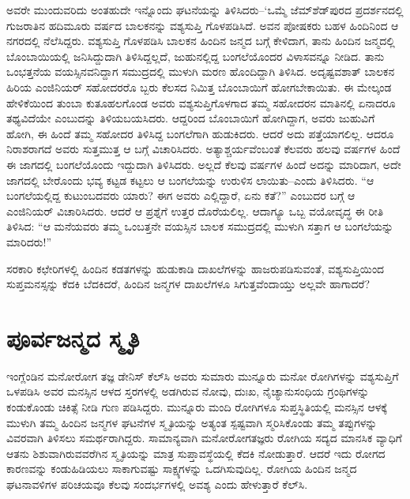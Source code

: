 ಅವರೇ ಮುಂದುವರಿದು ಅಂತಹುದೇ ಇನ್ನೊಂದು ಘಟನೆಯನ್ನು ತಿಳಿಸಿದರು–‘ಒಮ್ಮೆ ಜೆಮ್​ಶೆಡ್​ಪುರದ ಪ್ರದರ್ಶನದಲ್ಲಿ ಗುಜರಾತಿನ ಹದಿಮೂರು ವರ್ಷದ ಬಾಲಕನನ್ನು ವಶ್ಯಸುಪ್ತಿ ಗೊಳಪಡಿಸಿದೆ. ಅವನ ಪೋಷಕರು ಬಹಳ ಹಿಂದಿನಿಂದ ಆ ನಗರದಲ್ಲಿ ನೆಲೆಸಿದ್ದರು. ವಶ್ಯಸುಪ್ತಿ ಗೊಳಪಡಿಸಿ ಬಾಲಕನ ಹಿಂದಿನ ಜನ್ಮದ ಬಗ್ಗೆ ಕೇಳಿದಾಗ, ತಾನು ಹಿಂದಿನ ಜನ್ಮದಲ್ಲಿ ಬೊಂಬಾಯಿಯಲ್ಲಿ ಜನಿಸಿದ್ದುದಾಗಿ ತಿಳಿಸಿದ್ದಲ್ಲದೆ, ಜುಹುನಲ್ಲಿದ್ದ ಬಂಗಲೆಯೊಂದರ ವಿಳಾಸವನ್ನೂ ನೀಡಿದ. ತಾನು ಒಂಭತ್ತನೆಯ ವಯಸ್ಸಿನವನಿದ್ದಾಗ ಸಮುದ್ರದಲ್ಲಿ ಮುಳುಗಿ ಮರಣ ಹೊಂದಿದ್ದಾಗಿ ತಿಳಿಸಿದ. ಅದೃಷ್ಟವಶಾತ್ ಬಾಲಕನ ಹಿರಿಯ ಎಂಜಿನಿಯರ್ ಸಹೋದರರೊ ಬ್ಬರು ಕೆಲಸದ ನಿಮಿತ್ತ ಬೊಂಬಾಯಿಗೆ ಹೋಗಬೇಕಾಯಿತು. ಈ ಮೇಲ್ಕಂಡ ಹೇಳಿಕೆಯಿಂದ ತುಂಬಾ ಕುತೂಹಲಗೊಂಡ ಅವರು ವಶ್ಯಸುಪ್ತಿಗೊಳಗಾದ ತಮ್ಮ ಸಹೋದರನ ಮಾತಿನಲ್ಲಿ ಏನಾದರೂ ತಥ್ಯವಿದೆಯೇ ಎಂಬುದನ್ನು ತಿಳಿಯಬಯಸಿದರು. ಆದ್ದರಿಂದ ಬೊಂಬಾಯಿಗೆ ಹೋಗಿದ್ದಾಗ, ಅವರು ಜುಹುವಿಗೆ ಹೋಗಿ, ಈ ಹಿಂದೆ ತಮ್ಮ ಸಹೋದರ ತಿಳಿಸಿದ್ದ ಬಂಗಲೆಗಾಗಿ ಹುಡುಕಿದರು. ಆದರೆ ಅದು ಪತ್ತೆಯಾಗಲಿಲ್ಲ. ಆದರೂ ನಿರಾಶರಾಗದೆ ಅವರು ಸುತ್ತಮುತ್ತ ಆ ಬಗ್ಗೆ ವಿಚಾರಿಸಿದರು. ಅತ್ಯಾಶ್ಚರ್ಯವೆಂಬಂತೆ ಕೆಲವರು ಹಲವು ವರ್ಷಗಳ ಹಿಂದೆ ಈ ಜಾಗದಲ್ಲಿ ಬಂಗಲೆಯೊಂದು ಇದ್ದುದಾಗಿ ತಿಳಿಸಿದರು. ಅಲ್ಲದೆ ಕೆಲವು ವರ್ಷಗಳ ಹಿಂದೆ ಅದನ್ನು ಮಾರಿದಾಗ, ಅದೇ ಜಾಗದಲ್ಲಿ ಬೇರೊಂದು ಭವ್ಯ ಕಟ್ಟಡ ಕಟ್ಟಲು ಆ ಬಂಗಲೆಯನ್ನು ಉರುಳಿಸ ಲಾಯಿತು–ಎಂದು ತಿಳಿಸಿದರು. “ಆ ಬಂಗಲೆಯಲ್ಲಿದ್ದ ಕುಟುಂಬದವರು ಯಾರು? ಈಗ ಅವರು ಎಲ್ಲಿದ್ದಾರೆ, ಏನು ಕತೆ?” ಎಂಬುದರ ಬಗ್ಗೆ ಆ ಎಂಜಿನಿಯರ್ ವಿಚಾರಿಸಿದರು. ಆದರೆ ಆ ಪ್ರಶ್ನೆಗೆ ಉತ್ತರ ದೊರೆಯಲಿಲ್ಲ. ಆದಾಗ್ಯೂ ಒಬ್ಬ ವಯೋವೃದ್ಧ ಈ ರೀತಿ ತಿಳಿಸಿದ: “ಆ ಮನೆಯವರು ತಮ್ಮ ಒಂಬತ್ತನೇ ವಯಸ್ಸಿನ ಬಾಲಕ ಸಮುದ್ರದಲ್ಲಿ ಮುಳುಗಿ ಸತ್ತಾಗ ಆ ಬಂಗಲೆಯನ್ನು ಮಾರಿದರು!”

ಸರಕಾರಿ ಕಛೇರಿಗಳಲ್ಲಿ ಹಿಂದಿನ ಕಡತಗಳನ್ನು ಹುಡುಕಾಡಿ ದಾಖಲೆಗಳನ್ನು ಹಾಜರುಪಡಿಸುವಂತೆ, ವಶ್ಯಸುಪ್ತಿಯಿಂದ ಸುಪ್ತಮನಸ್ಸನ್ನು ಕೆದಕಿ ಬೆದಕಿದರೆ, ಹಿಂದಿನ ಜನ್ಮಗಳ ದಾಖಲೆಗಳೂ ಸಿಗುತ್ತವೆಂದಾಯ್ತು ಅಲ್ಲವೇ ಹಾಗಾದರೆ?


\section{ಪೂರ್ವಜನ್ಮದ ಸ್ಮೃತಿ}

ಇಂಗ್ಲೆಂಡಿನ ಮನೋರೋಗ ತಜ್ಞ ಡೇನಿಸ್ ಕೆಲ್​ಸಿ ಅವರು ಸುಮಾರು ಮುನ್ನೂರು ಮನೋ ರೋಗಿಗಳನ್ನು ವಶ್ಯಸುಪ್ತಿಗೆ ಒಳಪಡಿಸಿ ಅವರ ಮನಸ್ಸಿನ ಆಳದ ಸ್ತರಗಳಲ್ಲಿ ಅಡಗಿರುವ ನೋವು, ದುಃಖ, ನೈಚ್ಯಾನುಸಂಧಿಯ ಗ್ರಂಥಿಗಳನ್ನು  ಕಂಡುಕೊಂಡು ಚಿಕಿತ್ಸೆ ನೀಡಿ ಗುಣ ಪಡಿಸಿದ್ದರು. ಮುನ್ನೂರು ಮಂದಿ ರೋಗಿಗಳೂ ಸುಪ್ತಸ್ಥಿತಿಯಲ್ಲಿ ಮನಸ್ಸಿನ ಆಳಕ್ಕೆ ಮುಳುಗಿ ತಮ್ಮ ಹಿಂದಿನ ಜನ್ಮಗಳ ಘಟನೆಗಳ ಸ್ಮೃತಿಯನ್ನು ಅತ್ಯಂತ ಸ್ಪಷ್ಟವಾಗಿ ಸ್ಮರಿಸಿಕೊಂಡು ತಮ್ಮ ತಪ್ಪುಗಳನ್ನು ವಿವರವಾಗಿ ತಿಳಿಸಲು ಸಮರ್ಥರಾಗಿದ್ದರು. ಸಾಮಾನ್ಯವಾಗಿ ಮನೋರೋಗತಜ್ಞರು ರೋಗಿಯ ಸದ್ಯದ ಮಾನಸಿಕ ವ್ಯಾಧಿಗೆ ಆತನು ಶಿಶುವಾಗಿರುವವರೆಗಿನ ಸ್ಮೃತಿಯನ್ನು ಮಾತ್ರ ಸುಪ್ತಾವಸ್ಥೆಯಲ್ಲಿ ಕೆದಕಿ ನೋಡುತ್ತಾರೆ. ಆದರೆ ಇದು ರೋಗದ ಕಾರಣವನ್ನು ಕಂಡುಹಿಡಿಯಲು ಸಾಕಾಗುವಷ್ಟು ಸಾಕ್ಷ್ಯಗಳನ್ನು ಒದಗಿಸುವುದಿಲ್ಲ. ರೋಗಿಯ ಹಿಂದಿನ ಜನ್ಮದ ಘಟನಾವಳಿಗಳ ಪರಿಚಯವೂ ಕೆಲವು ಸಂದರ್ಭಗಳಲ್ಲಿ ಅವಶ್ಯ ಎಂದು ಹೇಳುತ್ತಾರೆ ಕೆಲ್​ಸಿ.

